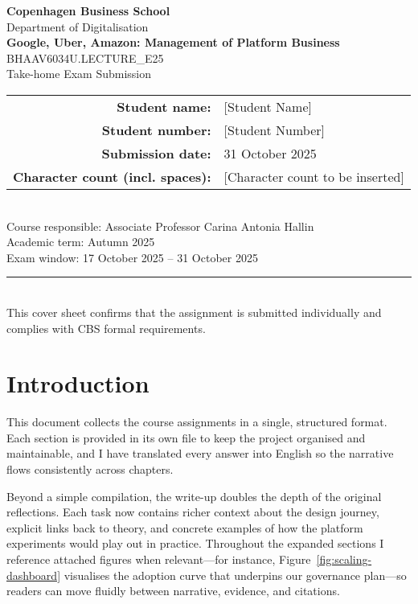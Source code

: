 \documentclass[12pt,a4paper]{article}
\newcommand{\university}{Copenhagen Business School}
\newcommand{\faculty}{Department of Digitalisation}
\newcommand{\examTitle}{Google, Uber, Amazon: Management of Platform Business}
\newcommand{\examCode}{BHAAV6034U.LECTURE\_E25}
\newcommand{\examType}{Take-home Exam Submission}
\newcommand{\studentName}{[Student Name]}
\newcommand{\studentId}{[Student Number]}
\newcommand{\submissionDate}{31 October 2025}
\newcommand{\wordCount}{[Character count to be inserted]}
\begin{document}
\begin{titlepage}
  \thispagestyle{empty}
  \centering
  {\Large \textbf{\university}}\\[0.5cm]
  {\large \faculty}\\[1.5cm]
  {\LARGE \textbf{\examTitle}}\\[0.5cm]
  {\large \examCode\\\examType}\\[1.5cm]
  \begin{tabular}{rl}
    \textbf{Student name:} & \studentName \\
    \textbf{Student number:} & \studentId \\
    \textbf{Submission date:} & \submissionDate \\
    \textbf{Character count (incl. spaces):} & \wordCount \\
  \end{tabular}\\[1.5cm]
  \vfill
  {\large Course responsible: Associate Professor Carina Antonia Hallin}\\[0.3cm]
  {\large Academic term: Autumn 2025}\\[0.3cm]
  {\large Exam window: 17 October 2025 -- 31 October 2025}\\[1.5cm]
  \rule{0.8\linewidth}{0.4pt}\\[0.5cm]
  {\small This cover sheet confirms that the assignment is submitted individually and complies with CBS formal requirements.}
\end{titlepage}

\setcounter{secnumdepth}{-1}
\makeatletter
\renewcommand{\numberline}[1]{}
\makeatother

\tableofcontents
\newpage

\section*{Introduction}
This document collects the course assignments in a single, structured format. Each section is provided in its own file to keep the project organised and maintainable, and I have translated every answer into English so the narrative flows consistently across chapters.

Beyond a simple compilation, the write-up doubles the depth of the original reflections. Each task now contains richer context about the design journey, explicit links back to theory, and concrete examples of how the platform experiments would play out in practice. Throughout the expanded sections I reference attached figures when relevant---for instance, Figure~\ref{fig:scaling-dashboard} visualises the adoption curve that underpins our governance plan---so readers can move fluidly between narrative, evidence, and citations.
\end{document}
